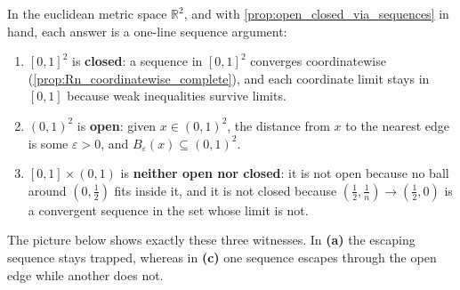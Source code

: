 \begin{example}
\label{ex:open_closed_neither_R2}
In the euclidean metric space $\mathbb{R}^2$, and with
\cref{prop:open_closed_via_sequences} in hand, each answer is a one-line sequence argument:
\begin{enumerate}[label=\textbf{(\alph*)}]
  \item $[0,1]^2$ is \textbf{closed}: a sequence in $[0,1]^2$ converges coordinatewise
    (\cref{prop:Rn_coordinatewise_complete}), and each coordinate limit stays in $[0,1]$ because
    weak inequalities survive limits.
  \item $(0,1)^2$ is \textbf{open}: given $x \in (0,1)^2$, the distance from $x$ to the nearest
    edge is some $\varepsilon>0$, and $B_\varepsilon(x) \subseteq (0,1)^2$.
  \item $[0,1] \times (0,1)$ is \textbf{neither open nor closed}: it is not open because no ball
    around $(0,\tfrac12)$ fits inside it, and it is not closed because
    $(\tfrac12, \tfrac1n) \to (\tfrac12, 0)$ is a convergent sequence in the set whose limit is
    not.
\end{enumerate}
The picture below shows exactly these three witnesses. In \textbf{(a)} the escaping sequence stays
trapped, whereas in \textbf{(c)} one sequence escapes through the open edge while another does
not.
\end{example}

